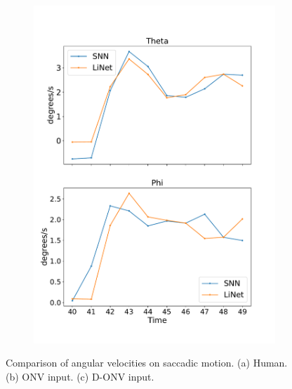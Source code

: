 \documentclass [MS] {UCLAthesis}
\begin{document}
\begin{figure}
\begin{subfigure}{0.2\textwidth}
        \caption{}
        \label{fig:saccade_human_vel_normal}
    \end{subfigure}
    \hfill
    \begin{subfigure}{0.2\textwidth}
        \centering
        \includegraphics[width=\textwidth]{saccade_human_vel_delta}
        \caption{}
        \label{fig:saccade_human_vel_delta}
    \end{subfigure}

    \caption[Angular velocities from saccadic motion, compared to a human subject]{Comparison of angular velocities on saccadic motion. (a) Human. (b) ONV input. (c) D-ONV input.}
    \label{fig:saccade_vel}
\end{figure}
\end{document}
